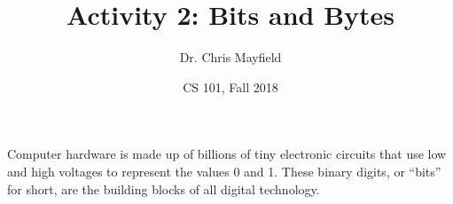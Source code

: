 \documentclass[12pt]{article}
\title{Activity 2: Bits and Bytes}
\author{Dr. Chris Mayfield}
\date{CS 101, Fall 2018}
\begin{document}
\maketitle

Computer hardware is made up of billions of tiny electronic circuits that use low and high voltages to represent the values 0 and 1.
These binary digits, or ``bits'' for short, are the building blocks of all digital technology.



\end{document}
